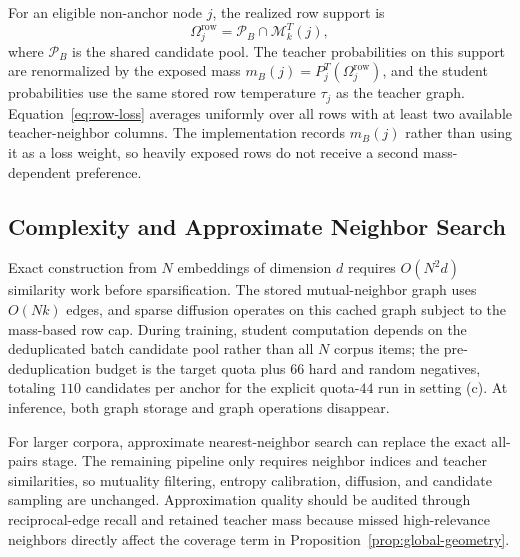 For an eligible non-anchor node $j$, the realized row support is
\begin{equation}
\Omega_j^{\mathrm{row}}=\mathcal P_B\cap\mathcal M_k^T(j),
\end{equation}
where $\mathcal P_B$ is the shared candidate pool. The teacher probabilities on this support are renormalized by the exposed mass $m_B(j)=P_j^T(\Omega_j^{\mathrm{row}})$, and the student probabilities use the same stored row temperature $\tau_j$ as the teacher graph. Equation~\eqref{eq:row-loss} averages uniformly over all rows with at least two available teacher-neighbor columns. The implementation records $m_B(j)$ rather than using it as a loss weight, so heavily exposed rows do not receive a second mass-dependent preference.

\subsection{Complexity and Approximate Neighbor Search}

Exact construction from $N$ embeddings of dimension $d$ requires $O(N^2d)$ similarity work before sparsification. The stored mutual-neighbor graph uses $O(Nk)$ edges, and sparse diffusion operates on this cached graph subject to the mass-based row cap. During training, student computation depends on the deduplicated batch candidate pool rather than all $N$ corpus items; the pre-deduplication budget is the target quota plus $66$ hard and random negatives, totaling $110$ candidates per anchor for the explicit quota-$44$ run in setting (c). At inference, both graph storage and graph operations disappear.

For larger corpora, approximate nearest-neighbor search can replace the exact all-pairs stage. The remaining pipeline only requires neighbor indices and teacher similarities, so mutuality filtering, entropy calibration, diffusion, and candidate sampling are unchanged. Approximation quality should be audited through reciprocal-edge recall and retained teacher mass because missed high-relevance neighbors directly affect the coverage term in Proposition~\ref{prop:global-geometry}.
